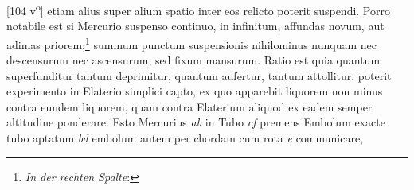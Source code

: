                         [104 v\textsuperscript{o}]  etiam 
                        alius super alium spatio inter eos relicto  poterit suspendi. Porro 
                        notabile est  si Mercurio\protect{} suspenso continuo, in infinitum, affundas  novum, aut adimas priorem;\footnote{\textit{In der rechten Spalte}: } summum  punctum suspensionis nihilominus nunquam nec descensurum  nec ascensurum, sed fixum mansurum. Ratio  est quia quantum superfunditur tantum deprimitur,  quantum aufertur, tantum attollitur.  poterit experimento in Elaterio\protect{} simplici capto, ex quo apparebit  liquorem non minus contra eundem liquorem, quam contra Elaterium\protect{} aliquod ex eadem semper altitudine ponderare. Esto  Mercurius\protect{} \textit{ab} in Tubo \textit{cf} premens Embolum\protect{}  
                        exacte tubo aptatum \textit{bd} embolum\protect{} autem  per chordam cum rota \textit{e} communicare, 

